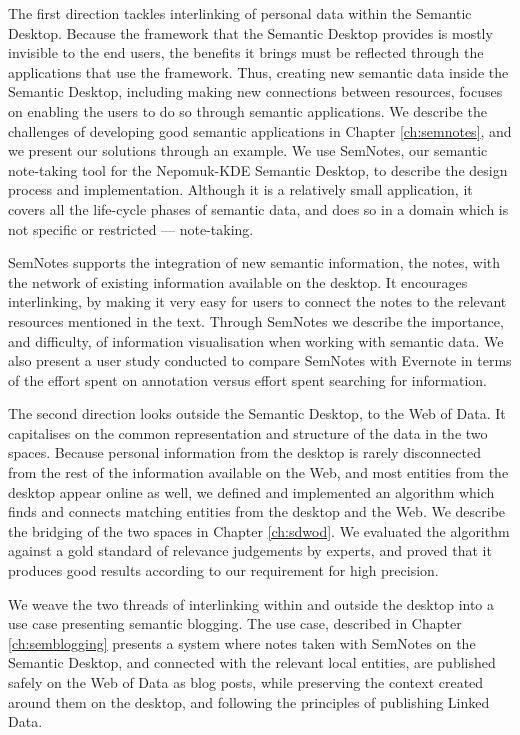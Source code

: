 The first direction tackles interlinking of personal data within the Semantic Desktop. Because the framework that the Semantic Desktop provides is mostly invisible to the end users, the benefits it brings must be reflected through the applications that use the framework. Thus, creating new semantic data inside the Semantic Desktop, including making new connections between resources, focuses on enabling the users to do so through semantic applications. 
We describe the challenges of developing good semantic applications in Chapter \ref{ch:semnotes}, and we present our solutions through an example. We use SemNotes, our semantic note-taking tool for the Nepomuk-KDE Semantic Desktop, to describe the design process and implementation. Although it is a relatively small application, it covers all the life-cycle phases of semantic data, and does so in a domain which is not specific or restricted --- note-taking.

SemNotes supports the integration of new semantic information, the notes, with the network of existing information available on the desktop. It encourages interlinking, by making it very easy for users to connect the notes to the relevant resources mentioned in the text. Through SemNotes we describe the importance, and difficulty, of information visualisation when working with semantic data. We also present a user study conducted to compare SemNotes with Evernote in terms of the effort spent on annotation versus effort spent searching for information. 

The second direction looks outside the Semantic Desktop, to the Web of Data. It capitalises on the common representation and structure of the data in the two spaces. Because personal information from the desktop is rarely disconnected from the rest of the information available on the Web, and most entities from the desktop appear online as well, we defined and implemented an algorithm which finds and connects matching entities from the desktop and the Web. We describe the bridging of the two spaces in Chapter \ref{ch:sdwod}. We evaluated the algorithm against a gold standard of relevance judgements by experts, and proved that it produces good results according to our requirement for high precision.

We weave the two threads of interlinking within and outside the desktop into a use case presenting semantic blogging. The use case, described in Chapter \ref{ch:semblogging} presents a system where notes taken with SemNotes on the Semantic Desktop, and connected with the relevant local entities, are published safely on the Web of Data as blog posts, while preserving the context created around them on the desktop, and following the principles of publishing Linked Data.

